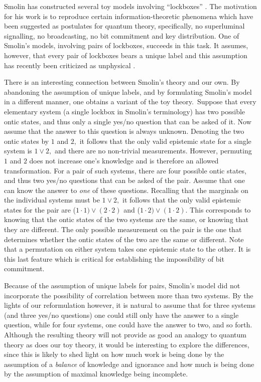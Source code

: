 \documentclass[pra,nofootinbib,showpacs,12pt]{revtex4}
\begin{document}
Smolin has constructed several toy models involving ``lockboxes'' \cite%
{Smolin}. The motivation for his work is to reproduce certain
information-theoretic phenomena which have been suggested as postulates for
quantum theory, specifically, no superluminal signalling, no broadcasting,
no bit commitment and key distribution. One of Smolin's models, involving
pairs of lockboxes, succeeds in this task. It assumes, however, that every
pair of lockboxes bears a unique label and this assumption has recently been
criticized as unphysical \cite{HalvorsonBub}.

There is an interesting connection between Smolin's theory and our own. By
abandoning the assumption of unique labels, and by formulating Smolin's
model in a different manner, one obtains a variant of the toy theory.\emph{\
}Suppose that every elementary system (a single lockbox in Smolin's
terminology) has two possible ontic states, and thus only a single yes/no
question that can be asked of it. Now assume that the answer to this
question is always unknown. Denoting the two ontic states by $1$ and $2,$ it
follows that the only valid epistemic state for a single system is $1\vee 2,$
and there are no non-trivial measurements. However, permuting $1$ and $2$
does not increase one's knowledge and is therefore an allowed
transformation. For a pair of such systems, there are four possible ontic
states, and thus two yes/no questions that can be asked of the pair. Assume
that one can know the answer to \emph{one} of these questions. Recalling
that the marginals on the individual systems must be $1\vee 2,$ it follows
that the only valid epistemic states for the pair are ($1\cdot 1)\vee
(2\cdot 2)$ and ($1\cdot 2)\vee (1\cdot 2).$ This corresponds to knowing
that the ontic states of the two systems are the same, or knowing that they
are different. The only possible measurement on the pair is the one that
determines whether the ontic states of the two are the same or different.
Note that a permutation on either system takes one epistemic state to the
other. It is this last feature which is critical for establishing the
impossibility of bit commitment.

Because of the assumption of unique labels for pairs, Smolin's model did not
incorporate the possibility of correlation between more than two systems. By
the lights of our reformulation however, it is natural to assume that for
three systems (and three yes/no questions) one could still only have the
answer to a single question, while for four systems, one could have the
answer to two, and so forth. Although the resulting theory will not provide
as good an analogy to quantum theory as does our toy theory, it would be
interesting to explore the differences, since this is likely to shed light
on how much work is being done by the assumption of a \emph{balance} of
knowledge and ignorance and how much is being done by the assumption of
maximal knowledge being incomplete.
\end{document}
